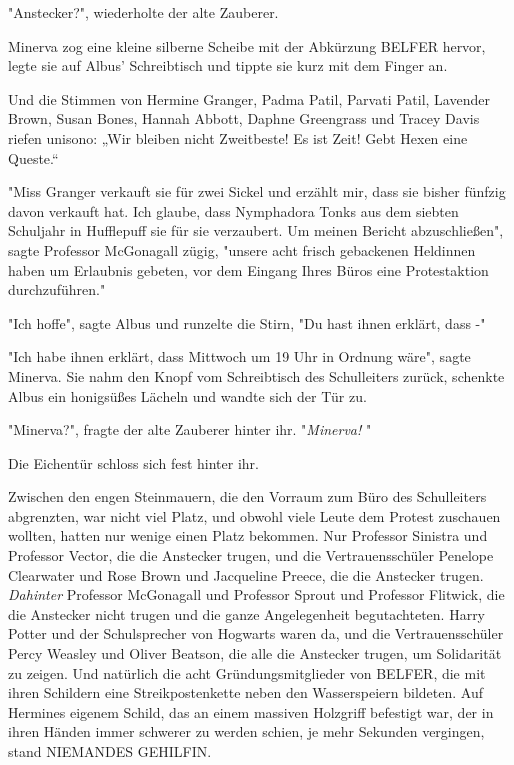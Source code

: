 {"Anstecker?", wiederholte der alte Zauberer.

Minerva zog eine kleine silberne Scheibe mit der Abkürzung BELFER hervor, legte sie auf Albus' Schreibtisch und tippte sie kurz mit dem Finger an.

Und die Stimmen von Hermine Granger, Padma Patil, Parvati Patil, Lavender Brown, Susan Bones, Hannah Abbott, Daphne Greengrass und Tracey Davis riefen unisono: „Wir bleiben nicht Zweitbeste! Es ist Zeit! Gebt Hexen eine Queste.“

"Miss Granger verkauft sie für zwei Sickel und erzählt mir, dass sie bisher fünfzig davon verkauft hat. Ich glaube, dass Nymphadora Tonks aus dem siebten Schuljahr in Hufflepuff sie für sie verzaubert. Um meinen Bericht abzuschließen", sagte Professor McGonagall zügig, "unsere acht frisch gebackenen Heldinnen haben um Erlaubnis gebeten, vor dem Eingang Ihres Büros eine Protestaktion durchzuführen."

"Ich hoffe", sagte Albus und runzelte die Stirn, "Du hast ihnen erklärt, dass -"

"Ich habe ihnen erklärt, dass Mittwoch um 19 Uhr in Ordnung wäre", sagte Minerva. Sie nahm den Knopf vom Schreibtisch des Schulleiters zurück, schenkte Albus ein honigsüßes Lächeln und wandte sich der Tür zu.

"Minerva?", fragte der alte Zauberer hinter ihr. "\emph{Minerva!} "

Die Eichentür schloss sich fest hinter ihr.

Zwischen den engen Steinmauern, die den Vorraum zum Büro des Schulleiters abgrenzten, war nicht viel Platz, und obwohl viele Leute dem Protest zuschauen wollten, hatten nur wenige einen Platz bekommen. Nur Professor Sinistra und Professor Vector, die die Anstecker trugen, und die Vertrauensschüler Penelope Clearwater und Rose Brown und Jacqueline Preece, die die Anstecker trugen. \emph{Dahinter} Professor McGonagall und Professor Sprout und Professor Flitwick, die die Anstecker nicht trugen und die ganze Angelegenheit begutachteten. Harry Potter und der Schulsprecher von Hogwarts waren da, und die Vertrauensschüler Percy Weasley und Oliver Beatson, die alle die Anstecker trugen, um Solidarität zu zeigen. Und natürlich die acht Gründungsmitglieder von BELFER, die mit ihren Schildern eine Streikpostenkette neben den Wasserspeiern bildeten. Auf Hermines eigenem Schild, das an einem massiven Holzgriff befestigt war, der in ihren Händen immer schwerer zu werden schien, je mehr Sekunden vergingen, stand NIEMANDES GEHILFIN.

}
